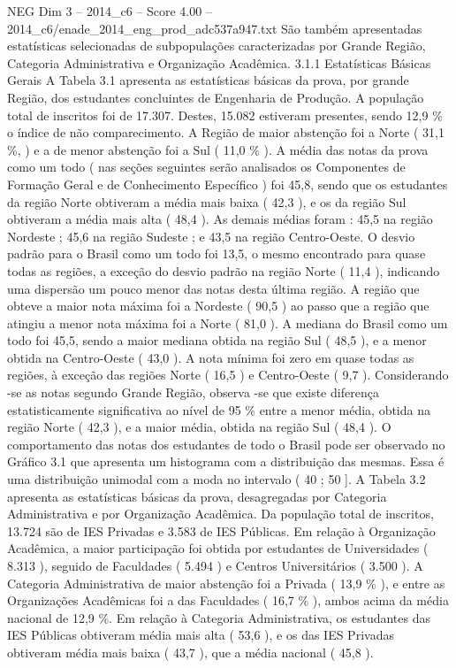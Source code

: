 \begin{textsample}{NEG Dim 3 – 2014\_c6 – Score 4.00 – 2014\_c6/enade\_2014\_eng\_prod\_adc537a947.txt}
São também apresentadas estatísticas selecionadas de subpopulações caracterizadas por Grande Região, Categoria Administrativa e Organização Acadêmica. 3.1.1 Estatísticas Básicas Gerais A Tabela 3.1 apresenta as estatísticas básicas da prova, por grande Região, dos estudantes concluintes de Engenharia de Produção.
A população total de inscritos foi de 17.307.
Destes, 15.082 estiveram presentes, sendo 12,9 \% o índice de não comparecimento.
A Região de maior abstenção foi a Norte ( 31,1 \%, ) e a de menor abstenção foi a Sul ( 11,0 \% ).
A média das notas da prova como um todo ( nas seções seguintes serão analisados os Componentes de Formação Geral e de Conhecimento Específico ) foi 45,8, sendo que os estudantes da região Norte obtiveram a média mais baixa ( 42,3 ), e os da região Sul obtiveram a média mais alta ( 48,4 ).
As demais médias foram : 45,5 na região Nordeste ; 45,6 na região Sudeste ; e 43,5 na região Centro-Oeste.
O desvio padrão para o Brasil como um todo foi 13,5, o mesmo encontrado para quase todas as regiões, a exceção do desvio padrão na região Norte ( 11,4 ), indicando uma dispersão um pouco menor das notas desta última região.
A região que obteve a maior nota máxima foi a Nordeste ( 90,5 ) ao passo que a região que atingiu a menor nota máxima foi a Norte ( 81,0 ).
A mediana do Brasil como um todo foi 45,5, sendo a maior mediana obtida na região Sul ( 48,5 ), e a menor obtida na Centro-Oeste ( 43,0 ).
A nota mínima foi zero em quase todas as regiões, à exceção das regiões Norte ( 16,5 ) e Centro-Oeste ( 9,7 ).
Considerando -se as notas segundo Grande Região, observa -se que existe diferença estatisticamente significativa ao nível de 95 \% entre a menor média, obtida na região Norte ( 42,3 ), e a maior média, obtida na região Sul ( 48,4 ).
O comportamento das notas dos estudantes de todo o Brasil pode ser observado no Gráfico 3.1 que apresenta um histograma com a distribuição das mesmas.
Essa é uma distribuição unimodal com a moda no intervalo ( 40 ; 50 ].
A Tabela 3.2 apresenta as estatísticas básicas da prova, desagregadas por Categoria Administrativa e por Organização Acadêmica.
Da população total de inscritos, 13.724 são de IES Privadas e 3.583 de IES Públicas.
Em relação à Organização Acadêmica, a maior participação foi obtida por estudantes de Universidades ( 8.313 ), seguido de Faculdades ( 5.494 ) e Centros Universitários ( 3.500 ).
A Categoria Administrativa de maior abstenção foi a Privada ( 13,9 \% ), e entre as Organizações Acadêmicas foi a das Faculdades ( 16,7 \% ), ambos acima da média nacional de 12,9 \%.
Em relação à Categoria Administrativa, os estudantes das IES Públicas obtiveram média mais alta ( 53,6 ), e os das IES Privadas obtiveram média mais baixa ( 43,7 ), que a média nacional ( 45,8 ).

\end{textsample}
